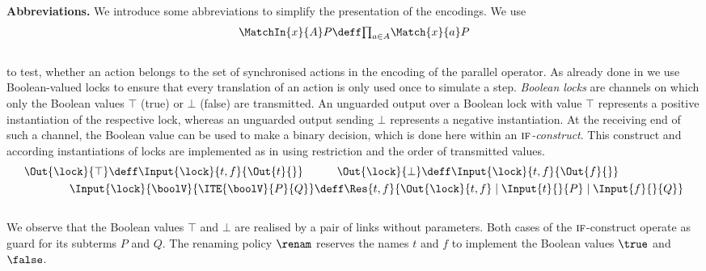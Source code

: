 \documentclass[copyright,creativecommons]{eptcs}
\begin{document}
\vspace{0.3em}
\noindent
\textbf{Abbreviations.}\;
We introduce some abbreviations to simplify the presentation of the encodings. We use
\vspace{-1.9em}
\begin{align*}
	\MatchIn{x}{A}P \deff \textstyle{\prod_{a \in A}} \Match{x}{a}P
\end{align*}
\vspace{-2em}\\
to test, whether an action belongs to the set of synchronised actions in the encoding of the parallel operator.
As already done in \cite{nestmann96, nestmannPierce00} we use Boolean-valued locks to ensure that every translation of an action is only used once to simulate a step.
\emph{Boolean locks} are channels on which only the Boolean values $ \top $ (true) or $ \bot $ (false) are transmitted. 
An unguarded output over a Boolean lock with value $ \top $ represents a positive instantiation of the respective lock, whereas an unguarded output sending $ \bot $ represents a negative instantiation. 
At the receiving end of such a channel, the Boolean value can be used to make a binary decision, which is done here within an \emph{$ \textsc{if} $-construct}.
This construct and according instantiations of locks are implemented as in \cite{nestmann96, nestmannPierce00} using restriction and the order of transmitted values.
\vspace{-0.5em}
\begin{align*}
	\Out{\lock}{\top} \deff \Input{\lock}{t, f}{\Out{t}{}} \quad & \quad\quad \Out{\lock}{\bot} \deff \Input{\lock}{t, f}{\Out{f}{}}\\
	\Input{\lock}{\boolV}{\ITE{\boolV}{P}{Q}} & \deff \Res{t, f}{\Out{\lock}{t, f} \mid \Input{t}{}{P} \mid \Input{f}{}{Q}}
\end{align*}
\vspace{-2em}\\
We observe that the Boolean values $ \top $ and $ \bot $ are realised by a pair of links without parameters. Both cases of the $\textsc{if}$-construct operate as guard for its subterms $ P $ and $ Q $. The renaming policy $ \renam $ reserves the names $ t $ and $ f $ to implement the Boolean values $ \true $ and $ \false $.
\end{document}

